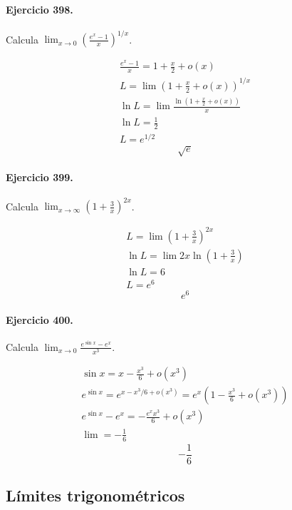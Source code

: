 \documentclass[11pt,a4paper]{article}
\begin{document}
\paragraph{Ejercicio 398.} Calcula $\displaystyle \lim_{x\to0}\left(\frac{e^x-1}{x}\right)^{1/x}$.

\[
\begin{aligned}
\frac{e^x-1}{x}=1+\frac{x}{2}+o(x)\\
L=\lim\left(1+\frac{x}{2}+o(x)\right)^{1/x}\\
\ln L=\lim\frac{\ln(1+\frac{x}{2}+o(x))}{x}\\
\ln L=\frac12\\
L=e^{1/2}
\end{aligned}
\]
\[\boxed{\sqrt e}\]


\paragraph{Ejercicio 399.} Calcula $\displaystyle \lim_{x\to\infty}\left(1+\frac{3}{x}\right)^{2x}$.

\[
\begin{aligned}
L=\lim\left(1+\frac{3}{x}\right)^{2x}\\
\ln L=\lim 2x\ln\left(1+\frac{3}{x}\right)\\
\ln L=6\\
L=e^6
\end{aligned}
\]
\[\boxed{e^6}\]


\paragraph{Ejercicio 400.} Calcula $\displaystyle \lim_{x\to0}\frac{e^{\sin x}-e^x}{x^3}$.

\[
\begin{aligned}
\sin x=x-\frac{x^3}{6}+o(x^3)\\
e^{\sin x}=e^{x-x^3/6+o(x^3)}=e^x\left(1-\frac{x^3}{6}+o(x^3)\right)\\
e^{\sin x}-e^x=-\frac{e^xx^3}{6}+o(x^3)\\
\lim=-\frac16
\end{aligned}
\]
\[\boxed{-\frac16}\]


\newpage

\subsection*{Límites trigonométricos}

\end{document}
